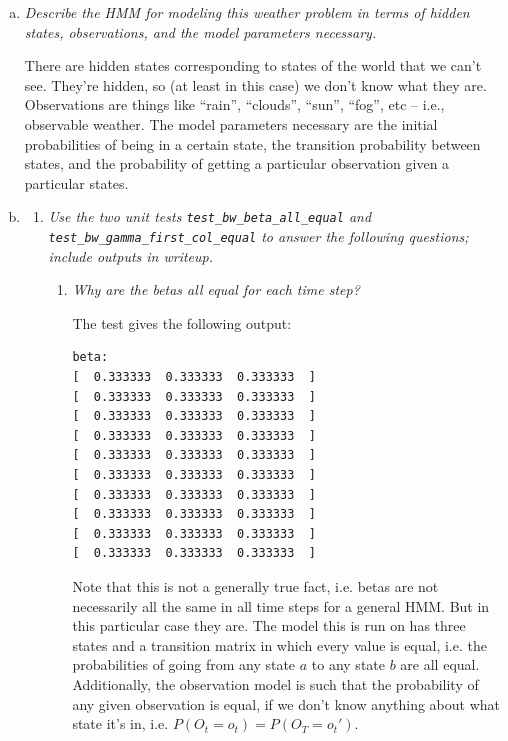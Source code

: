 \documentclass{article}
\begin{document}
\begin{enumerate}[(a)]
\item \emph{Describe the HMM for modeling this weather problem in terms of hidden
  states, observations, and the model parameters necessary.}

  There are hidden states corresponding to states of the world that we can't
  see. They're hidden, so (at least in this case) we don't know what they are.
  Observations are things like ``rain'', ``clouds'', ``sun'', ``fog'', etc --
  i.e., observable weather.
  The model parameters necessary are the initial probabilities of being in a
  certain state, the transition probability between states, and the probability
  of getting a particular observation given a particular states.

\item
  \begin{enumerate}
    \setcounter{enumii}2
  \item \emph{Use the two unit tests \emph{\texttt{test\_bw\_beta\_all\_equal}}
    and
    \emph{\texttt{test\_bw\_gamma\_first\_col\_equal}} to answer the following questions;
    include outputs in writeup.}

    \begin{enumerate}[(1)]
    \item \emph{Why are the betas all equal for each time step?}

      The test gives the following output:
\begin{verbatim}
beta:
[  0.333333  0.333333  0.333333  ]
[  0.333333  0.333333  0.333333  ]
[  0.333333  0.333333  0.333333  ]
[  0.333333  0.333333  0.333333  ]
[  0.333333  0.333333  0.333333  ]
[  0.333333  0.333333  0.333333  ]
[  0.333333  0.333333  0.333333  ]
[  0.333333  0.333333  0.333333  ]
[  0.333333  0.333333  0.333333  ]
[  0.333333  0.333333  0.333333  ]
\end{verbatim}

      Note that this is not a generally true fact, i.e. betas are not
      necessarily all the same in all time steps for a general HMM.  But
      in this particular case they are. The model this is run on has
      three states and a transition matrix in which every value is
      equal, i.e. the probabilities of going from any state $a$ to any
      state $b$ are all equal.  Additionally, the observation model is
      such that the probability of any given observation is equal, if we
      don't know anything about what state it's in,
      i.e. $P(O_t=o_t)=P(O_T=o_t')$.


\end{enumerate}
\end{enumerate}
\end{enumerate}
\end{document}
